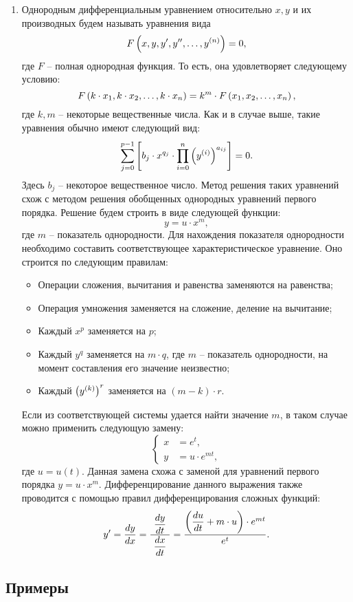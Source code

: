 \begin{enumerate}
		\item Однородным дифференциальным уравнением относительно $x, y$ и их производных будем называть уравнения вида
			\[ F\left( x, y, y', y'', \dots, y^{(n)} \right) = 0, \]
			где $F$ -- полная однородная функция. То есть, она удовлетворяет следующему условию:
			\[ F\left( k \cdot x_1, k \cdot x_2, \dots, k \cdot x_n \right) = k^m \cdot F\left( x_1, x_2, \dots, x_n \right), \]
			где $k, m$ -- некоторые вещественные числа. Как и в случае выше, такие уравнения обычно имеют следующий вид:
			\[ \sum_{j = 0}^{p-1} \left[ b_j \cdot x^{q_j} \cdot \prod_{i=0}^{n} \left( y^{(i)} \right)^{a_{ij}} \right] = 0. \]
			Здесь $b_j$ -- некоторое вещественное число. Метод решения таких уравнений схож с методом решения обобщенных однородных уравнений первого порядка. Решение будем строить в виде следующей функции:
			\[ y = u \cdot x^m, \]
			где $m$ -- показатель однородности. Для нахождения показателя однородности необходимо составить соответствующее характеристическое уравнение. Оно строится по следующим правилам:
			\begin{itemize}
				\item Операции сложения, вычитания и равенства заменяются на равенства;
				\item Операция умножения заменяется на сложение, деление на вычитание;
				\item Каждый $x^p$ заменяется на $p$;
				\item Каждый $y^q$ заменяется на $m \cdot q$, где $m$ -- показатель однородности, на момент составления его значение неизвестно;
				\item Каждый $\left( y^{(k)} \right)^{r}$ заменяется на $(m - k) \cdot r$.
			\end{itemize}
			Если из соответствующей системы удается найти значение $m$, в таком случае можно применить следующую замену:
			\[ \left\lbrace \begin{split} 
				x &= e^{t}, \\
				y &= u \cdot e^{mt},
			\end{split} \right. \]
			где $u = u(t)$. Данная замена схожа с заменой для уравнений первого порядка $y = u \cdot x^m$. Дифференцирование данного выражения также проводится с помощью правил дифференцирования сложных функций:
			\[ y' = \dfrac{d y}{d x} = \frac{~\dfrac{d y}{d t}~}{~\dfrac{d x}{d t}~} = \frac{\left( \dfrac{d u}{d t} + m \cdot u \right) \cdot e^{mt}}{e^{t}}. \]

	\end{enumerate}

	\subsection{Примеры}

